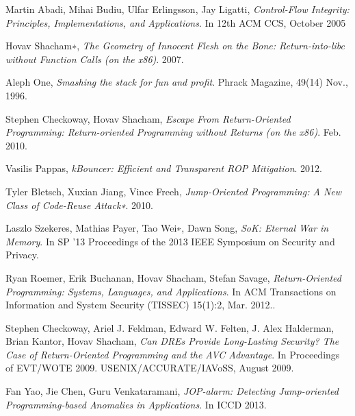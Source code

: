 \documentclass[11pt]{amsart}
\begin{document}
\begin{thebibliography}{9}

  Martin Abadi, Mihai Budiu, Ulfar Erlingsson, Jay Ligatti,
  \emph{Control-Flow Integrity: Principles, Implementations, and Applications}.
  In 12th ACM CCS, October 2005

  Hovav Shacham∗,
  \emph{The Geometry of Innocent Flesh on the Bone: Return-into-libc without Function Calls (on the x86)}.
  2007.

  Aleph One,
  \emph{Smashing the stack for fun and profit}.
  Phrack Magazine, 49(14) Nov.,
  1996.

  Stephen Checkoway, Hovav Shacham,
  \emph{Escape From Return-Oriented Programming: Return-oriented Programming without Returns (on the x86)}.
  Feb. 2010.

  Vasilis Pappas,
  \emph{kBouncer: Efficient and Transparent ROP Mitigation}.
  2012.

  Tyler Bletsch, Xuxian Jiang, Vince Freeh,
  \emph{Jump-Oriented Programming: A New Class of Code-Reuse Attack∗}.
  2010.

  Laszlo Szekeres, Mathias Payer, Tao Wei∗, Dawn Song,
  \emph{SoK: Eternal War in Memory}.
  In SP '13 Proceedings of the 2013 IEEE Symposium on Security and Privacy.

  Ryan Roemer, Erik Buchanan, Hovav Shacham, Stefan Savage,
  \emph{Return-Oriented Programming: Systems, Languages, and Applications}.
  In ACM Transactions on Information and System Security (TISSEC) 15(1):2, Mar. 2012..

  Stephen Checkoway, Ariel J. Feldman, Edward W. Felten, J. Alex Halderman, Brian Kantor, Hovav Shacham,
  \emph{Can DREs Provide Long-Lasting Security? The Case of Return-Oriented Programming and the AVC Advantage}.
  In Proceedings of EVT/WOTE 2009. USENIX/ACCURATE/IAVoSS, August 2009.

  Fan Yao, Jie Chen, Guru Venkataramani,
  \emph{JOP-alarm: Detecting Jump-oriented Programming-based Anomalies in Applications}.
  In ICCD 2013.
\end{thebibliography}
\end{document}

